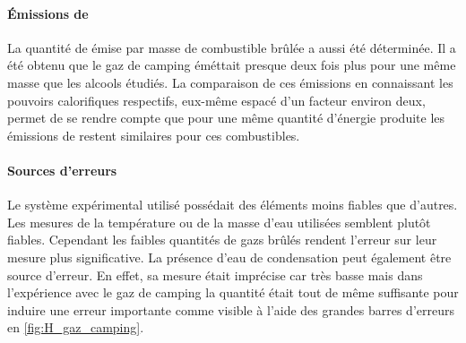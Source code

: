 \paragraph*{Émissions de }
La quantité de  émise par masse de combustible brûlée a aussi été déterminée. Il a été obtenu que le gaz de camping éméttait presque deux fois plus pour une même masse que les alcools étudiés. La comparaison de ces émissions en connaissant les pouvoirs calorifiques respectifs, eux-même espacé d'un facteur environ deux, permet de se rendre compte que pour une même quantité d'énergie produite les émissions de  restent similaires pour ces combustibles. 

\paragraph*{Sources d'erreurs}
Le système expérimental utilisé possédait des éléments moins fiables que d'autres. Les mesures de la température ou de la masse d'eau utilisées semblent plutôt fiables. Cependant les faibles quantités de gazs brûlés rendent l'erreur sur leur mesure plus significative. La présence d'eau de condensation peut également être source d'erreur. En effet, sa mesure était imprécise car très basse mais dans l'expérience avec le gaz de camping la quantité était tout de même suffisante pour induire une erreur importante comme visible à l'aide des grandes barres d'erreurs en \autoref{fig:H_gaz_camping}.
